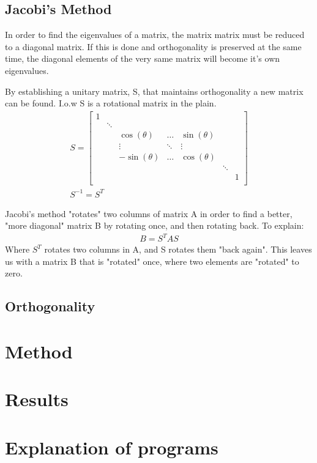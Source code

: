 \documentclass[11pt,a4paper,notitlepage]{article}
\begin{document}
\subsection{Jacobi's Method}
In order to find the eigenvalues of a matrix, the matrix matrix must be reduced to a diagonal matrix. If this is done and orthogonality is preserved at the same time, the diagonal elements of the very same matrix will become it's own eigenvalues. 

By establishing a unitary matrix, S, that maintains orthogonality a new matrix can be found.
I.o.w S is a rotational matrix in the plain.
\begin{align*}
	S = \begin{bmatrix}
		 1 & & & & &  \\
		 & \ddots & & & & \\
		 & & \cos(\theta)& \hdots & \sin(\theta)& & \\
		 & & \vdots & \ddots & \vdots & & \\
		 & & -\sin(\theta)& \hdots & \cos(\theta) & & \\
		 & & & & & \ddots & \\
		 & & & & & & 1 \\
	\end{bmatrix} \\
	S^{-1} = S^T
\end{align*}

Jacobi's method "rotates" two columns of matrix A in order to find a better, "more diagonal" matrix B by rotating once, and then rotating back. To explain:
\begin{align*}
	B = S^T A S
\end{align*}
Where $S^T$ rotates two columns in A, and S rotates them "back again". This leaves us with a matrix B that is "rotated" once, where two elements are "rotated" to zero. 
\subsection{Orthogonality}
\section{Method} \label{sec:method}
\section{Results}
\section{Explanation of programs}
\end{document}
